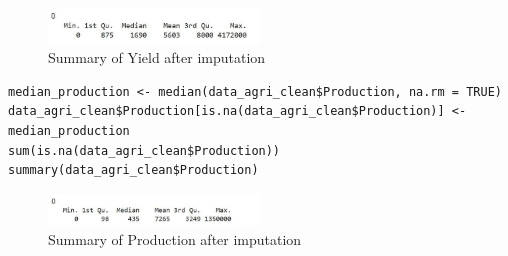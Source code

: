 \begin{figure}[h]
\centering
\includegraphics[width=0.5\textwidth]{figures/impute_yield.jpg}
\caption{ Summary of Yield after imputation}
\end{figure}

\begin{verbatim}
median_production <- median(data_agri_clean$Production, na.rm = TRUE)
data_agri_clean$Production[is.na(data_agri_clean$Production)] <-
median_production
sum(is.na(data_agri_clean$Production))
summary(data_agri_clean$Production)
\end{verbatim}

\begin{figure}[h]
\centering
\includegraphics[width=0.5\textwidth]{figures/impute_prod.jpg}
\caption{ Summary of Production after imputation}
\end{figure}

